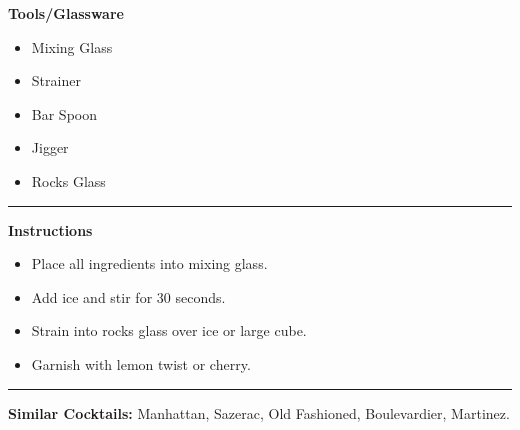 \hspace{.01\textwidth}\vrule\hspace{.01\textwidth}
\begin{minipage}[t]{.49\textwidth}
    \noindent
    \textbf{\large Tools/Glassware}
    \begin{itemize}
        \item Mixing Glass
        \item Strainer
        \item Bar Spoon
        \item Jigger
        \item Rocks Glass
    \end{itemize}
\end{minipage}
\vspace{.5em}\hrule\vspace{.5em}
\noindent
\begin{minipage}{\textwidth}
    \noindent
    \textbf{\large Instructions}
    \begin{itemize}
        \item Place all ingredients into mixing glass.
        \item Add ice and stir for 30 seconds.
        \item Strain into rocks glass over ice or large cube.
        \item Garnish with lemon twist or cherry.
    \end{itemize}
\end{minipage}
\vspace{.5em}\hrule\vspace{.5em}
\noindent
\textbf{\large Similar Cocktails:} Manhattan, Sazerac, Old Fashioned, Boulevardier, Martinez.
\newpage
